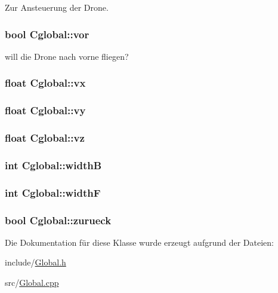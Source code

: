 Zur Ansteuerung der Drone. 

\hypertarget{class_cglobal_ac0b3c90a19b5395a404bb9e5aee44e1c}{
\subsubsection[{vor}]{\setlength{\rightskip}{0pt plus 5cm}bool {\bf Cglobal::vor}}}
\label{class_cglobal_ac0b3c90a19b5395a404bb9e5aee44e1c}


will die Drone nach vorne fliegen? 

\hypertarget{class_cglobal_abafbed62176301706747c04ef3046aae}{
\subsubsection[{vx}]{\setlength{\rightskip}{0pt plus 5cm}float {\bf Cglobal::vx}}}
\label{class_cglobal_abafbed62176301706747c04ef3046aae}
\hypertarget{class_cglobal_a0967372a0ede7b8b9a24957df663b7b3}{
\subsubsection[{vy}]{\setlength{\rightskip}{0pt plus 5cm}float {\bf Cglobal::vy}}}
\label{class_cglobal_a0967372a0ede7b8b9a24957df663b7b3}
\hypertarget{class_cglobal_af9ef9759f83ae67b7e220570a7738ef5}{
\subsubsection[{vz}]{\setlength{\rightskip}{0pt plus 5cm}float {\bf Cglobal::vz}}}
\label{class_cglobal_af9ef9759f83ae67b7e220570a7738ef5}
\hypertarget{class_cglobal_a3adbbe83dbdab17a3506572de5444d14}{
\subsubsection[{widthB}]{\setlength{\rightskip}{0pt plus 5cm}int {\bf Cglobal::widthB}}}
\label{class_cglobal_a3adbbe83dbdab17a3506572de5444d14}
\hypertarget{class_cglobal_add77c33bb751ff75fc5e6bc0409d4540}{
\subsubsection[{widthF}]{\setlength{\rightskip}{0pt plus 5cm}int {\bf Cglobal::widthF}}}
\label{class_cglobal_add77c33bb751ff75fc5e6bc0409d4540}
\hypertarget{class_cglobal_a1b0b85d52fea92c819e421db042b704d}{
\subsubsection[{zurueck}]{\setlength{\rightskip}{0pt plus 5cm}bool {\bf Cglobal::zurueck}}}
\label{class_cglobal_a1b0b85d52fea92c819e421db042b704d}


Die Dokumentation für diese Klasse wurde erzeugt aufgrund der Dateien:\begin{DoxyCompactItemize}
\item 
include/\hyperlink{_global_8h}{Global.h}\item 
src/\hyperlink{_global_8cpp}{Global.cpp}\end{DoxyCompactItemize}
